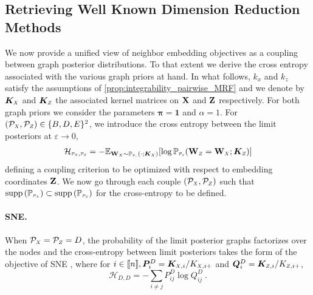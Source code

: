 \subsection{Retrieving Well Known Dimension Reduction Methods}\label{sec:retrieving_DR_methods}

We now provide a unified view of neighbor embedding objectives as a coupling between graph posterior distributions. To that extent we derive the cross entropy associated with the various graph priors at hand. In what follows, $k_x$ and $k_z$ satisfy the assumptions of \cref{prop:integrability_pairwise_MRF} and we denote by $\bm{K}_{\scaleto{X}{4pt}}$ and $\bm{K}_{\scaleto{Z}{4pt}}$ the associated kernel matrices on  $\mathbf{X}$ and $\mathbf{Z}$ respectively. For both graph priors we consider the parameters $\bm{\pi}=\bm{1}$ and $\alpha=1$. For $(\mathcal{P}_{\scaleto{X}{4pt}}, \mathcal{P}_{\scaleto{Z}{4pt}}) \in \{B,D,E\}^2$, we introduce the 
cross entropy between the limit posteriors at $\varepsilon \to 0$,
\begin{align*}
    \mathcal{H}_{\scaleto{\mathcal{P}_X}{4pt}, \scaleto{\mathcal{P}_Z}{4pt}} = - \mathbb{E}_{\Wb_{\scaleto{X}{3pt}} \sim \mathbb{P}_{\scaleto{\mathcal{P}_{\scaleto{X}{2pt}}}{3pt}}(\cdot;\bm{K}_{\scaleto{X}{3pt}})}[\log \mathbb{P}_{\scaleto{\mathcal{P}_{\scaleto{Z}{3pt}}}{4pt}}(\Wb_{\scaleto{Z}{4pt}} = \Wb_{\scaleto{X}{4pt}}; \bm{K}_{\scaleto{Z}{4pt}})]
\end{align*}
defining a coupling criterion to be optimized with respect to embedding coordinates $\mathbf{Z}$. We now go through each couple $(\mathcal{P}_{\scaleto{X}{4pt}}, \mathcal{P}_{\scaleto{Z}{4pt}})$ such that $\operatorname{supp}\left(\mathbb{P}_{\scaleto{\mathcal{P}_X}{4pt}}\right) \subset \operatorname{supp}\left(\mathbb{P}_{\scaleto{\mathcal{P}_Z}{4pt}}\right)$ for the cross-entropy to be defined.

\paragraph{SNE.}
When $\mathcal{P}_{\scaleto{X}{4pt}} = \mathcal{P}_{\scaleto{Z}{4pt}} = D$, the probability of the limit posterior graphs factorizes over the nodes and the cross-entropy between limit posteriors takes the form of the objective of SNE \cite{hinton2002stochastic}, where for $i \in \integ{n}, \bm{P}^{D}_{i} = \bm{K}_{\scaleto{X}{4pt},i} / K_{\scaleto{X}{4pt},i+}$ and $\bm{Q}^{D}_{i} = \bm{K}_{\scaleto{Z}{4pt},i} / K_{\scaleto{Z}{4pt},i+}$,
$$\mathcal{H}_{D,D}= - \sum_{i \neq j} P^{D}_{ij} \log Q^{D}_{ij} \:.$$

